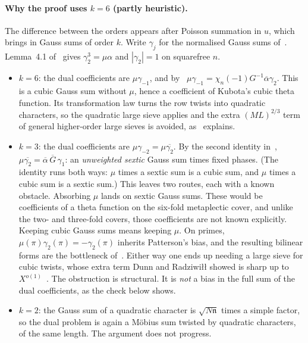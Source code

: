 \documentclass[11pt]{article}
\theoremstyle{remark}
\begin{document}
\paragraph{Why the proof uses $k=6$ (partly heuristic).} The difference between the orders
appears after Poisson summation in $u$, which brings in Gauss sums of order $k$. Write
$\gamma_j$ for the normalised Gauss sums of~\cite{OAI}. Lemma~4.1 of~\cite{OAI} gives
$\gamma_2^3=\mu\alpha$ and $|\gamma_2|=1$ on squarefree $n$.
\begin{itemize}
\item $k=6$: the dual coefficients are $\mu\gamma_{-1}$, and by~\cite[(4.5)]{OAI}
  $\mu\gamma_{-1}=\chi_n(-1)G^{-1}\overline\alpha\gamma_2$. This is a cubic Gauss sum without
  $\mu$, hence a coefficient of Kubota's cubic theta function. Its transformation law turns
  the row twists into quadratic characters, so the quadratic large sieve applies and the
  extra $(ML)^{2/3}$ term of general higher-order large sieves is avoided, as~\cite{OAI}
  explains.
\item $k=3$: the dual coefficients are $\mu\gamma_{-2}=\mu\overline{\gamma_2}$. By the
  second identity in~\cite[(4.2)]{OAI}, $\mu\overline{\gamma_2}=\overline\alpha\,\overline G\,\gamma_1$:
  an \emph{unweighted sextic} Gauss sum times fixed phases. (The identity runs both ways:
  $\mu$ times a sextic sum is a cubic sum, and $\mu$ times a cubic sum is a sextic sum.) This
  leaves two routes, each with a known obstacle. Absorbing $\mu$ lands on sextic Gauss sums.
  These would be coefficients of a theta function on the six-fold metaplectic cover, and
  unlike the two- and three-fold covers, those coefficients are not known explicitly.
  Keeping cubic Gauss sums means keeping $\mu$. On primes, $\mu(\pi)\gamma_2(\pi)=-\gamma_2(\pi)$
  inherits Patterson's bias, and the resulting bilinear forms are the bottleneck
  of~\cite{HB00,DR}. Either way one ends up needing a large sieve for cubic twists, whose
  extra term Dunn and Radziwiłł showed is sharp up to $X^{o(1)}$~\cite{DR}. The obstruction
  is structural. It is \emph{not} a bias in the full sum of the dual coefficients, as the
  check below shows.
\item $k=2$: the Gauss sum of a quadratic character is $\sqrt{N\mathfrak n}$ times a simple
  factor, so the dual problem is again a Möbius sum twisted by quadratic characters, of the
  same length. The argument does not progress.
\end{itemize}
\end{document}
